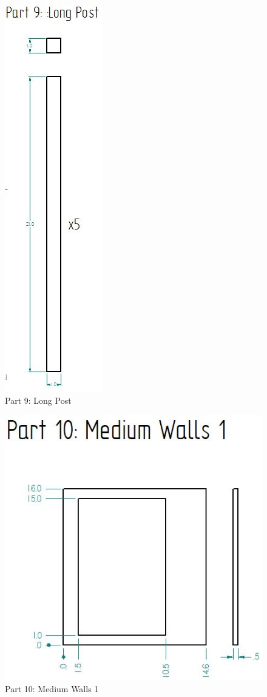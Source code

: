 \documentclass[12pt, titlepage]{article}
\begin{document}
\begin{figure}[H]
    \centerline{\includegraphics[scale=.5]{Part 9.jpg}}
    \caption{Part 9: Long Post}
    \label{fig}
\end{figure}

\begin{figure}[H]
    \centerline{\includegraphics[scale=.5]{Part 10.jpg}}
    \caption{Part 10: Medium Walls 1}
    \label{fig}
\end{figure}
\end{document}
